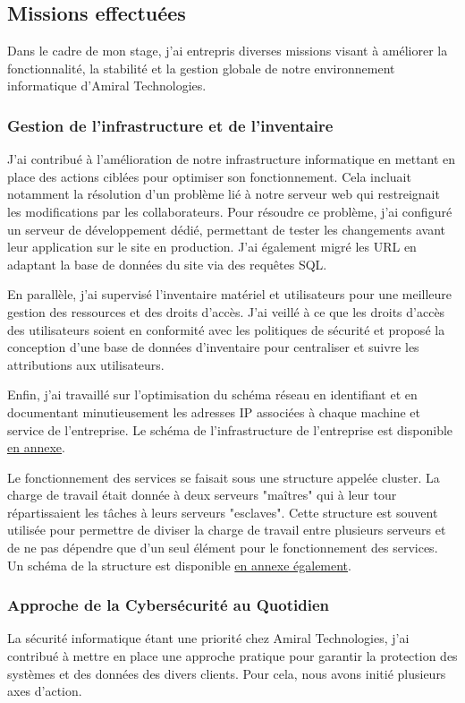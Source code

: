 \subsection{Missions effectuées}
Dans le cadre de mon stage, j'ai entrepris diverses missions visant à améliorer la fonctionnalité, la stabilité et la gestion globale de notre environnement informatique d'Amiral Technologies.

\subsubsection{Gestion de l'infrastructure et de l'inventaire}
J'ai contribué à l'amélioration de notre infrastructure informatique en mettant en place des actions ciblées pour optimiser son fonctionnement.
Cela incluait notamment la résolution d'un problème lié à notre serveur web qui restreignait les modifications par les collaborateurs.
Pour résoudre ce problème, j'ai configuré un serveur de développement dédié, permettant de tester les changements avant leur application sur le site en production.
J'ai également migré les URL en adaptant la base de données du site via des requêtes SQL.

En parallèle, j'ai supervisé l'inventaire matériel et utilisateurs pour une meilleure gestion des ressources et des droits d'accès.
J'ai veillé à ce que les droits d'accès des utilisateurs soient en conformité avec les politiques de sécurité et proposé la conception d'une base de données d'inventaire pour centraliser et suivre les attributions aux utilisateurs.

Enfin, j'ai travaillé sur l'optimisation du schéma réseau en identifiant et en documentant minutieusement les adresses IP associées à chaque machine et service de l'entreprise.
Le schéma de l'infrastructure de l'entreprise est disponible \hyperref[infra]{en annexe}.

Le fonctionnement des services se faisait sous une structure appelée cluster.
La charge de travail était donnée à deux serveurs "maîtres" qui à leur tour répartissaient les tâches à leurs serveurs "esclaves".
Cette structure est souvent utilisée pour permettre de diviser la charge de travail entre plusieurs serveurs et de ne pas dépendre que d'un seul élément pour le fonctionnement des services.
Un schéma de la structure est disponible \hyperref[balancer]{en annexe également}.

\subsubsection{Approche de la Cybersécurité au Quotidien}
La sécurité informatique étant une priorité chez Amiral Technologies, j'ai contribué à mettre en place une approche pratique pour garantir la protection des systèmes et des données des divers clients.
Pour cela, nous avons initié plusieurs axes d'action.

